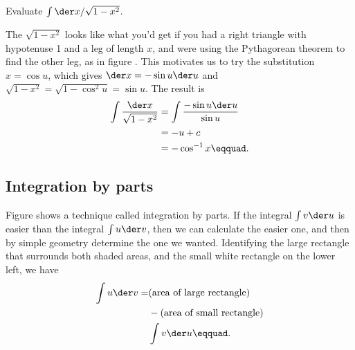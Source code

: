 \begin{eg}
\egquestion Evaluate $\int \der x/\sqrt{1-x^2}$.

\eganswer The $\sqrt{1-x^2}$ looks like what you'd get if you had a right
triangle with hypotenuse 1 and a leg of length $x$, and were using the
Pythagorean theorem to find the other leg, as in figure .
This motivates us to try the substitution $x=\cos u$, which gives
$\der x=-\sin u\der u$ and $\sqrt{1-x^2}=\sqrt{1-\cos^2u}=\sin u$. The result is
\begin{align*}
  \int \frac{\der x}{\sqrt{1-x^2}} &= \int \frac{-\sin u\der u}{\sin u} \\
                 &= -u+c \\
                 &= -\cos^{-1}x\eqquad.
\end{align*}
\end{eg}
%

\subsection{Integration by parts}

Figure  shows a technique called integration by parts.
If the integral $\int v\der u$ is easier than the integral $\int u\der v$,
then we can calculate the easier one, and then by simple geometry determine
the one we wanted. Identifying the large rectangle that surrounds both
shaded areas, and the small white rectangle on the lower left, we have
\begin{align*}
  \int u\der v =& (\text{area of large rectangle})\\
                &-(\text{area of small rectangle})\\
                &\int v\der u\eqquad.
\end{align*}


